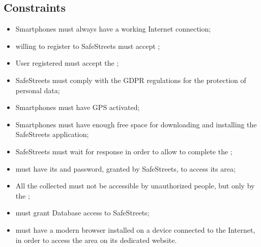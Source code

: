 \documentclass[../../RASD.tex]{subfiles}
\begin{document}
 \subsection{Constraints}
 	\begin{itemize}
 		\item Smartphones must always have a working Internet connection;
 		\item {} willing to register to SafeStreets must accept ;
 		\item User registered must accept the ;
 		\item SafeStreets must comply with the GDPR regulations for the protection of  personal data;
 		\item Smartphones must have GPS activated;
 		\item Smartphones must have enough free space for downloading and installing the SafeStreets application;
 		\item SafeStreets must wait for  response in order to allow  to complete the ;
 		\item {} must have its  and password, granted by SafeStreets, to access its  area;
 		\item All the collected  must not be accessible by unauthorized people, but only by the ;
 		\item {} must grant  Database access to SafeStreets;
 		\item {} must have a modern browser installed on a device connected to the Internet, in order to access the  area on its dedicated website. 

 	\end{itemize}
\end{document}
